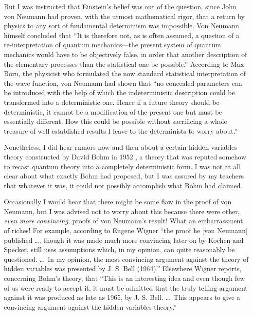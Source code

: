 \documentclass[12pt]{article}
\begin{document}
But I was instructed that Einstein's belief was out of the question,
since John von Neumann had proven, with the utmost mathematical rigor, that
a return by physics to any sort of fundamental determinism was impossible.
Von Neumann himself \cite{vN} concluded that ``It is therefore not, as is
often assumed, a question of a re-interpretation of quantum mechanics---the
present system of quantum mechanics would have to be objectively false, in
order that another description of the elementary processes than the
statistical one be possible.'' According to Max Born, the physicist who
formulated the now standard statistical interpretation of the wave
function, von Neumann had shown that \cite{born} ``no concealed parameters
can be introduced with the help of which the indeterministic description
could be transformed into a deterministic one.  Hence if a future theory
should be deterministic, it cannot be a modification of the present one but
must be essentially different. How this could be possible without
sacrificing a whole treasure of well established results I leave to the
determinists to worry about.''

Nonetheless, I did hear rumors now and then about a certain
hidden variables theory constructed by David Bohm in 1952 \cite{Bohm52}, a
theory that was reputed somehow to recast quantum theory into a completely
deterministic form. I was not at all clear about what exactly Bohm had
proposed, but I was assured by my teachers that whatever it was, it could
not possibly accomplish what Bohm had claimed.

Occasionally I would hear that there might be some flaw in the proof of von
Neumann, but I was advised not to worry about this because there were
other, {\it even more convincing}, proofs of von Neumann's result! What
an embarrassment of riches! For example, according to Eugene Wigner \cite[page
291]{Wigner1} ``the proof he [von Neumann] published \dots, though it was
made much more convincing later on by Kochen and Specker, still uses
assumptions which, in my opinion, can quite reasonably be questioned. \dots\
In my opinion, the most convincing argument against the theory of hidden
variables was presented by J. S. Bell (1964).'' Elsewhere \cite{Wigner2}
Wigner reports, concerning Bohm's theory, that ``This is an interesting
idea and even though few of us were ready to accept it, it must be admitted
that the truly telling argument against it was produced as late as 1965, by
J. S.  Bell. \dots\  This appears to give a convincing argument against the
hidden variables theory.''
\end{document}
